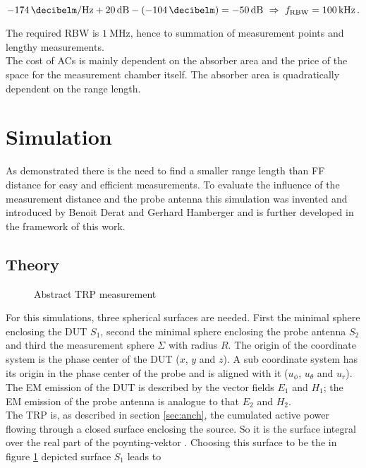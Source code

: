\begin{equation}
\SI{-174}{\decibelm\per\hertz}+\SI{20}{\decibel}-\left(\SI{-104}{\decibelm}\right)=\SI{-50}{\decibel}\ \Rightarrow\ f_{\text{RBW}}=\SI{100}{\kilo\hertz}\,.
\end{equation}

The required \ac{RBW} is $\SI{1}{\mega\hertz}$, hence to summation of measurement points and lengthy measurements.\\
The cost of \acp{AC} is mainly dependent on the absorber area and the price of the space for the measurement chamber itself. The absorber area is quadratically dependent on the range length.
\section{Simulation}

As demonstrated there is the need to find a smaller range length than \ac{FF} distance for easy and efficient measurements. To evaluate the influence of the measurement distance and the probe antenna this simulation was invented and introduced by Benoit Derat and Gerhard Hamberger \cite{mypaper} and is further developed in the framework of this work.

\subsection{Theory}

\begin{figure}[h]
\centering
\def\svgwidth{0.5\textwidth}

\caption{Abstract TRP measurement}
\label{fig:trpmeas}
\end{figure}

For this simulations, three spherical surfaces are needed. First the minimal sphere enclosing the \ac{DUT} $S_1$, second the minimal sphere enclosing the probe antenna $S_2$ and third the measurement sphere $\Sigma$ with radius $R$. The origin of the coordinate system is the phase center of the \ac{DUT} ($x$, $y$ and $z$). A sub coordinate system has its origin in the phase center of the probe and is aligned with it ($u_\phi$, $u_\theta$ and $u_r$). The \ac{EM} emission of the \ac{DUT} is described by the vector fields $E_1$ and $H_1$; the \ac{EM} emission of the probe antenna is analogue to that $E_2$ and $H_2$.\\
The \ac{TRP} is, as described in section \ref{sec:anch}, the cumulated active power flowing through a closed surface enclosing the source. So it is the surface integral over the real part of the poynting-vektor \cite{mypaper}. Choosing this surface to be the in figure \ref{fig:trpmeas} depicted surface $S_1$ leads to

